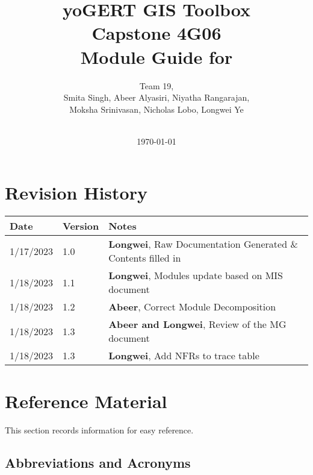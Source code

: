 \documentclass[12pt, titlepage]{article}
\begin{document}
\title{\textbf{yoGERT GIS Toolbox}\\ Capstone 4G06\\ Module Guide for }

\author{Team 19,
		\\ Smita Singh, Abeer Alyasiri, Niyatha Rangarajan,\\ Moksha Srinivasan, Nicholas Lobo, Longwei Ye \\\\
}

\date{\today}

\maketitle


\section{Revision History}

\begin{tabularx}{\textwidth}{p{3cm}p{2cm}X}
\toprule {\bf Date} & {\bf Version} & {\bf Notes}\\
\midrule
1/17/2023 & 1.0 & \textbf{Longwei}, Raw Documentation Generated \& Contents filled in\\
1/18/2023 & 1.1 & \textbf{Longwei}, Modules update based on MIS document\\
1/18/2023 & 1.2 & \textbf{Abeer}, Correct Module Decomposition\\
1/18/2023 & 1.3 & \textbf{Abeer and Longwei}, Review of the MG document\\
1/18/2023 & 1.3 & \textbf{Longwei}, Add NFRs to trace table\\
\bottomrule
\end{tabularx}

\newpage

\section{Reference Material}

This section records information for easy reference.

\subsection{Abbreviations and Acronyms}
\end{document}
